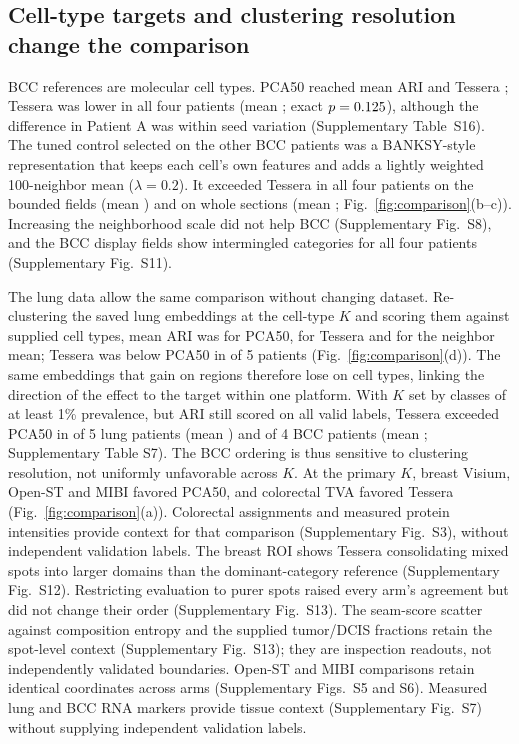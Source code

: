 \documentclass[11pt]{article}
\newcommand{\panelref}[2]{Fig.~\ref{#1}(#2)}
\begin{document}
\subsection{Cell-type targets and clustering resolution change the comparison}
BCC references are molecular cell types. PCA50 reached mean ARI \BccPca{} and Tessera \BccFull{}; Tessera was lower in all four patients (mean \BccDelta{}; exact \(p=0.125{}\)), although the difference in Patient A was within seed variation (Supplementary Table~S16). The tuned control selected on the other BCC patients was a BANKSY-style representation that keeps each cell's own features and adds a lightly weighted 100-neighbor mean (\(\lambda=0.2\)). It exceeded Tessera in all four patients on the bounded fields (mean \BccNestedDelta{}) and on whole sections (mean \BccWholeVsControlMean{}; \panelref{fig:comparison}{b--c}). Increasing the neighborhood scale did not help BCC (Supplementary Fig.~S8), and the BCC display fields show intermingled categories for all four patients (Supplementary Fig.~S11).

The lung data allow the same comparison without changing dataset. Re-clustering the saved lung embeddings at the cell-type \(K\) and scoring them against supplied cell types, mean ARI was \CellTypePca{} for PCA50, \CellTypeTessera{} for Tessera and \CellTypeMean{} for the neighbor mean; Tessera was below PCA50 in \CellTypeTesseraLower{} of 5 patients (\panelref{fig:comparison}{d}). The same embeddings that gain on regions therefore lose on cell types, linking the direction of the effect to the target within one platform. With \(K\) set by classes of at least 1\% prevalence, but ARI still scored on all valid labels, Tessera exceeded PCA50 in \LungCommonKBetter{} of 5 lung patients (mean \LungCommonKDelta{}) and \BccCommonKBetter{} of 4 BCC patients (mean \BccCommonKDelta{}; Supplementary Table S7). The BCC ordering is thus sensitive to clustering resolution, not uniformly unfavorable across \(K\). At the primary \(K\), breast Visium, Open-ST and MIBI favored PCA50, and colorectal TVA favored Tessera (\panelref{fig:comparison}{a}). Colorectal assignments and measured protein intensities provide context for that comparison (Supplementary Fig.~S3), without independent validation labels. The breast ROI shows Tessera consolidating mixed spots into larger domains than the dominant-category reference (Supplementary Fig.~S12). Restricting evaluation to purer spots raised every arm's agreement but did not change their order (Supplementary Fig.~S13). The seam-score scatter against composition entropy and the supplied tumor/DCIS fractions retain the spot-level context (Supplementary Fig.~S13); they are inspection readouts, not independently validated boundaries. Open-ST and MIBI comparisons retain identical coordinates across arms (Supplementary Figs.~S5 and S6). Measured lung and BCC RNA markers provide tissue context (Supplementary Fig.~S7) without supplying independent validation labels.
\end{document}
